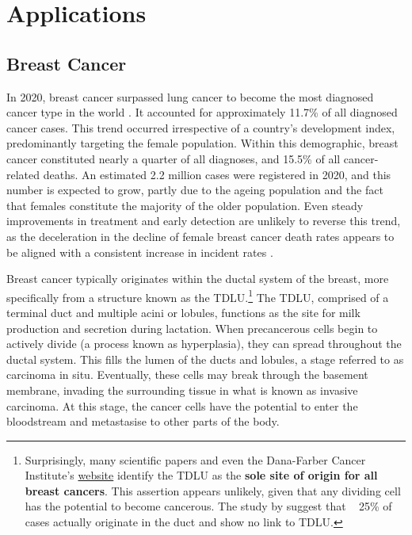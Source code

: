 \chapter{Applications}
\label{sec:chapter-basiss-applications}

\section{Breast Cancer}

In 2020, breast cancer surpassed lung cancer to become the most diagnosed cancer type in the world \parencite{Sung2021-xv}. It accounted for approximately 11.7\% of all diagnosed cancer cases. This trend occurred irrespective of a country's development index, predominantly targeting the female population. Within this demographic, breast cancer constituted nearly a quarter of all diagnoses, and 15.5\% of all cancer-related deaths. An estimated 2.2 million cases were registered in 2020, and this number is expected to grow, partly due to the ageing population and the fact that females constitute the majority of the older population. Even steady improvements in treatment and early detection are unlikely to reverse this trend, as the deceleration in the decline of female breast cancer death rates appears to be aligned with a consistent increase in incident rates \parencite{Cronin2022-mc}.

Breast cancer typically originates within the ductal system of the breast, more specifically from a structure known as the \ac{TDLU}.\footnote{Surprisingly, many scientific papers and even the Dana-Farber Cancer Institute's \href{https://www.dana-farber.org/health-library/articles/what-is-lobular-breast-cancer-}{website} identify the \ac{TDLU} as the  \textbf{sole site of origin for all breast cancers}. This assertion appears unlikely, given that any dividing cell has the potential to become cancerous. The study by \textcite{Tabar2014-ea} suggest that ~ 25\% of cases actually originate in the duct and show no link to \ac{TDLU}.} The \ac{TDLU}, comprised of a terminal duct and multiple acini or lobules, functions as the site for milk production and secretion during lactation. When precancerous cells begin to actively divide (a process known as hyperplasia), they can spread throughout the ductal system. This fills the lumen of the ducts and lobules, a stage referred to as carcinoma in situ. Eventually, these cells may break through the basement membrane, invading the surrounding tissue in what is known as invasive carcinoma. At this stage, the cancer cells have the potential to enter the bloodstream and metastasise to other parts of the body.

